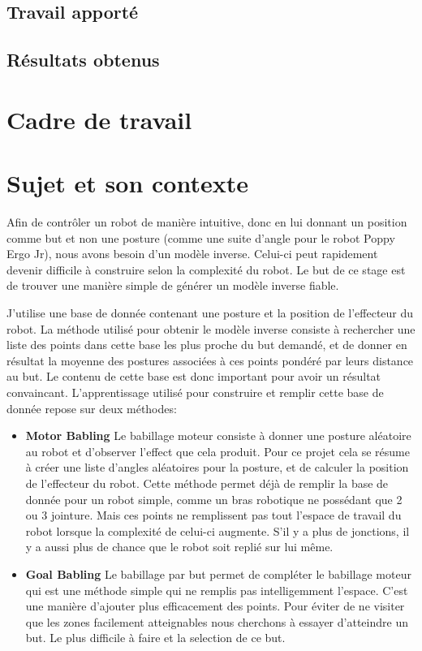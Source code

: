 \documentclass[11pt,french]{article}
\begin{document}
\subsection{Travail apporté}
\subsection{Résultats obtenus}

\section{Cadre de travail}

\section{Sujet et son contexte}

Afin de contrôler un robot de manière intuitive, donc en lui donnant un position comme but et non une posture (comme une suite d'angle pour le robot Poppy Ergo Jr), nous avons besoin d'un modèle inverse. Celui-ci peut rapidement devenir difficile à construire selon la complexité du robot. Le but de ce stage est de trouver une manière simple de générer un modèle inverse fiable.

J'utilise une base de donnée contenant une posture et la position de l'effecteur du robot. La méthode utilisé pour obtenir le modèle inverse consiste à rechercher une liste des points dans cette base les plus proche du but demandé, et de donner en résultat la moyenne des postures associées à ces points pondéré par leurs distance au but. Le contenu de cette base est donc important pour avoir un résultat convaincant. L'apprentissage utilisé pour construire et remplir cette base de donnée repose sur deux méthodes:
\begin{itemize}
    \item \textbf{Motor Babling} Le babillage moteur consiste à donner une posture aléatoire au robot et d'observer l'effect que cela produit. Pour ce projet cela se résume à créer une liste d'angles aléatoires pour la posture, et de calculer la position de l'effecteur du robot. Cette méthode permet déjà de remplir la base de donnée pour un robot simple, comme un bras robotique ne possédant que 2 ou 3 jointure. Mais ces points ne remplissent pas tout l'espace de travail du robot lorsque la complexité de celui-ci augmente. S'il y a plus de jonctions, il y a aussi plus de chance que le robot soit replié sur lui même.
    \item \textbf{Goal Babling} Le babillage par but permet de compléter le babillage moteur qui est une méthode simple qui ne remplis pas intelligemment l'espace. C'est une manière d'ajouter plus efficacement des points. Pour éviter de ne visiter que les zones facilement atteignables nous cherchons à essayer d'atteindre un but. Le plus difficile à faire et la selection de ce but.
\end{itemize}
\end{document}
